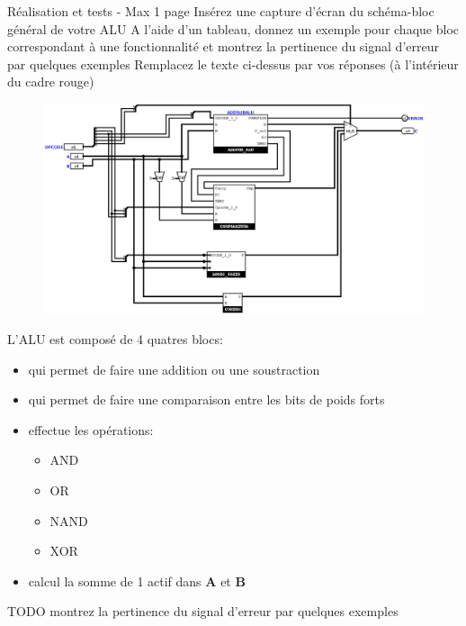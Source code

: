 \documentclass[a4paper]{article}
\begin{document}
\begin{tcolorbox}[colframe=Monokaimagenta,colback=white]
Réalisation et tests - Max 1 page 
Insérez une capture d’écran du schéma-bloc général de votre ALU
A l’aide d’un tableau, donnez un exemple pour chaque bloc correspondant à une fonctionnalité et montrez la pertinence du signal d’erreur par quelques exemples
Remplacez le texte ci-dessus par vos réponses (à l’intérieur du cadre rouge)

\begin{figure}[H]
    \centering
    \includegraphics[width=\textwidth]{src/ALU.png}
    \label{fig:ALU}
\end{figure}

L'ALU est composé de 4 quatres blocs:
\begin{itemize}

\item    {} qui permet de faire une addition ou une soustraction
\item    {} qui permet de faire une comparaison entre les bits de poids forts
\item    {} effectue les opérations:
    \begin{itemize}
        \item     AND
        \item     OR
        \item     NAND
        \item     XOR
    \end{itemize}
\item    {} calcul la somme de 1 actif dans \textbf{A} et \textbf{B}

\end{itemize}


TODO montrez la pertinence du signal d’erreur par quelques exemples\\


\end{tcolorbox}
\end{document}
